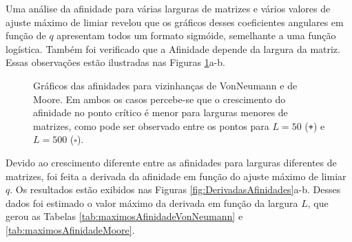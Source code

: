 \documentclass[
	12pt,				%
	openright,			%
	twoside,			%
	a4paper,			%
	english,			%
	french,				%
	spanish,			%
	brazil				%
	]{abntex2}
\begin{document}
Uma análise da afinidade para várias larguras de matrizes e vários valores de ajuste máximo de limiar revelou que os gráficos desses coeficientes angulares em função de $q$ apresentam todos um formato sigmóide, semelhante a uma função logística. Também foi verificado que a Afinidade depende da largura da matriz. Essas observações estão ilustradas nas Figuras \ref{fig:afinidades}a-b.
\begin{figure}
    \centering

    \caption{Gráficos das afinidades para vizinhanças de VonNeumann e de Moore. Em ambos os casos percebe-se que o crescimento do afinidade no ponto crítico é menor para larguras menores de matrizes, como pode ser observado entre os pontos para $L=50$ (\texttt{+}) e $L=500$ ($\square$).}
    \label{fig:afinidades}
\end{figure}

Devido ao crescimento diferente entre as afinidades para larguras diferentes de matrizes, foi feita a derivada da afinidade em função do ajuste máximo de limiar $q$. Os resultados estão exibidos nas Figuras \ref{fig:DerivadasAfinidades}a-b. Desses dados foi estimado o valor máximo da derivada em função da largura $L$, que gerou as Tabelas \ref{tab:maximosAfinidadeVonNeumann} e \ref{tab:maximosAfinidadeMoore}.
\end{document}
